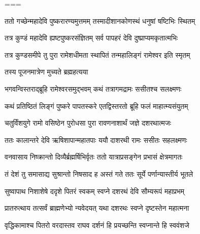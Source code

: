 ===


\vakta{}
\shrota{}
\tags{}
\notes{}

\storymeta





\twolineshloka
{ततो गच्छेन्महादेवि पुष्करारण्यमुत्तमम्}
{तस्मादीशानकोणस्थं धनुषां षष्टिभिः स्थितम्}%

\twolineshloka
{तत्र कुण्डं महादेवि ह्यष्टपुष्करसंज्ञितम्}
{सर्व पापहरं देवि दुष्प्राप्यमकृतात्मभिः}%

\twolineshloka
{तत्र कुण्डसमीपे तु पुरा रामेशधीमता}
{स्थापितं तन्महालिङ्गं रामेश्वर इति स्मृतम्}%

\onelineshloka
{तस्य पूजनमात्रेण मुच्यते ब्रह्महत्यया}%


\twolineshloka
{भगवन्विस्तराद्ब्रूहि रामेश्वरसमुद्भवम्}
{कथं तत्रागमद्रामः ससीतश्च सलक्ष्मणः}%

\twolineshloka
{कथं प्रतिष्ठितं लिङ्गं पुष्करे पापतस्करे}
{एतद्विस्तरतो ब्रूहि फलं माहात्म्यसंयुतम्}%


\twolineshloka
{चतुर्विंशयुगे रामो वसिष्ठेन पुरोधसा}
{पुरा रावणनाशार्थं जज्ञे दशरथात्मजः}%

\twolineshloka
{ततः कालान्तरे देवि ऋषिशापान्महातपाः}
{ययौ दाशरथी रामः ससीतः सहलक्ष्मणः}%

\twolineshloka
{वनवासाय निष्क्रान्तो दिव्यैर्ब्रह्मर्षिभिर्वृतः}
{ततो यात्राप्रसङ्गेन प्रभासं क्षेत्रमागतः}%

\twolineshloka
{तं देशं तु समासाद्य सुश्रान्तो निषसाद ह}
{अस्तं गते ततः सूर्ये पर्णान्यास्तीर्य भूतले}%

\twolineshloka
{सुष्वापाथ निशाशेषे ददृशे पितरं स्वकम्}
{स्वप्ने दशरथं देवि सौम्यरूपं महाप्रभम्}%

\twolineshloka
{प्रातरुत्थाय तत्सर्वं ब्राह्मणेभ्यो न्यवेदयत्}
{यथा दशरथः स्वप्ने दृष्टस्तेन महात्मना}%


\twolineshloka
{वृद्धिकामाश्च पितरो वरदास्तव राघव}
{दर्शनं हि प्रयच्छन्ति स्वप्नान्ते हि स्ववंशजे}%


